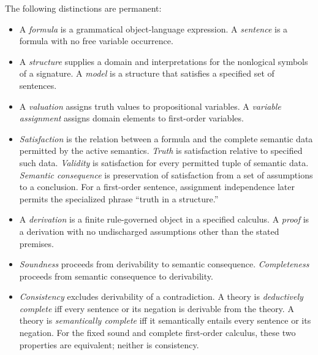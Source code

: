 The following distinctions are permanent:
\begin{itemize}
  \item A \emph{formula} is a grammatical object-language expression.  A
        \emph{sentence} is a formula with no free variable occurrence.
  \item A \emph{structure} supplies a domain and interpretations for the
        nonlogical symbols of a signature.  A \emph{model} is a structure that
        satisfies a specified set of sentences.
  \item A \emph{valuation} assigns truth values to propositional variables.  A
        \emph{variable assignment} assigns domain elements to first-order
        variables.
  \item \emph{Satisfaction} is the relation between a formula and the complete
        semantic data permitted by the active semantics.  \emph{Truth} is
        satisfaction relative to specified such data.  \emph{Validity} is
        satisfaction for every permitted tuple of semantic data.
        \emph{Semantic consequence} is preservation of satisfaction from a set
        of assumptions to a conclusion.  For a first-order sentence, assignment
        independence later permits the specialized phrase ``truth in a
        structure.''
  \item A \emph{derivation} is a finite rule-governed object in a specified
        calculus.  A \emph{proof} is a derivation with no undischarged
        assumptions other than the stated premises.
  \item \emph{Soundness} proceeds from derivability to semantic consequence.
        \emph{Completeness} proceeds from semantic consequence to derivability.
  \item \emph{Consistency} excludes derivability of a contradiction.
        A theory is \emph{deductively complete} iff every sentence or its
        negation is derivable from the theory.  A theory is
        \emph{semantically complete} iff it semantically entails every sentence
        or its negation.  For the fixed sound and complete first-order calculus,
        these two properties are equivalent; neither is consistency.
\end{itemize}

